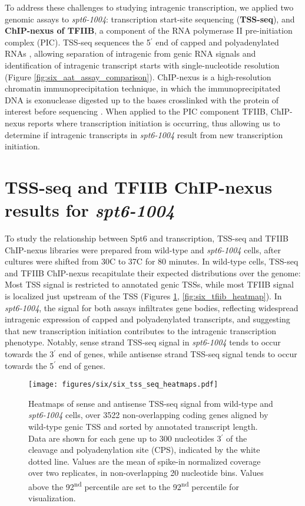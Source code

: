 To address these challenges to studying intragenic transcription, we applied two genomic assays to \textit{spt6-1004}: transcription start-site sequencing (\textbf{TSS-seq}), and \textbf{ChIP-nexus of TFIIB}, a component of the RNA polymerase II pre-initiation complex (PIC).
TSS-seq sequences the 5$^\prime$ end of capped and polyadenylated RNAs \citep{arribere2013, malabat2015}, allowing separation of intragenic from genic RNA signals and identification of intragenic transcript starts with single-nucleotide resolution (Figure \ref{fig:six_aat_assay_comparison}).
ChIP-nexus is a high-resolution chromatin immunoprecipitation technique, in which the immunoprecipitated DNA is exonuclease digested up to the bases crosslinked with the protein of interest before sequencing \citep{he2015}.
When applied to the PIC component TFIIB, ChIP-nexus reports where transcription initiation is occurring, thus allowing us to determine if intragenic transcripts in \textit{spt6-1004} result from new transcription initiation.

\section{TSS-seq and TFIIB ChIP-nexus results for \textit{spt6-1004}}
\label{sec:six_tss_tfiib}

To study the relationship between Spt6 and transcription, TSS-seq and TFIIB ChIP-nexus libraries were prepared from wild-type and \textit{spt6-1004} cells, after cultures were shifted from 30\textdegree C to 37\textdegree C for 80 minutes.
In wild-type cells, TSS-seq and TFIIB ChIP-nexus recapitulate their expected distributions over the genome: Most TSS signal is restricted to annotated genic TSSs, while most TFIIB signal is localized just upstream of the TSS (Figures \ref{fig:six_tss_seq_heatmaps}, \ref{fig:six_tfiib_heatmap}).
In \textit{spt6-1004}, the signal for both assays infiltrates gene bodies, reflecting widespread intragenic expression of capped and polyadenylated transcripts, and suggesting that new transcription initiation contributes to the intragenic transcription phenotype.
Notably, sense strand TSS-seq signal in \textit{spt6-1004} tends to occur towards the 3$^\prime$ end of genes, while antisense strand TSS-seq signal tends to occur towards the 5$^\prime$ end of genes.

\begin{figure}[h]
    \centering
    \texttt{[image: figures/six/six\_tss\_seq\_heatmaps.pdf]}
    \caption[Heatmaps of sense and antisense TSS-seq signal from wild-type and \textit{spt6-1004} cells, over non-overlapping coding genes.]{Heatmaps of sense and antisense TSS-seq signal from wild-type and \textit{spt6-1004} cells, over 3522 non-overlapping coding genes aligned by wild-type genic TSS and sorted by annotated transcript length. Data are shown for each gene up to 300 nucleotides 3$^\prime$ of the cleavage and polyadenylation site (CPS), indicated by the white dotted line. Values are the mean of spike-in normalized coverage over two replicates, in non-overlapping 20 nucleotide bins. Values above the 92\textsuperscript{nd} percentile are set to the 92\textsuperscript{nd} percentile for visualization.}
    \label{fig:six_tss_seq_heatmaps}
\end{figure}

